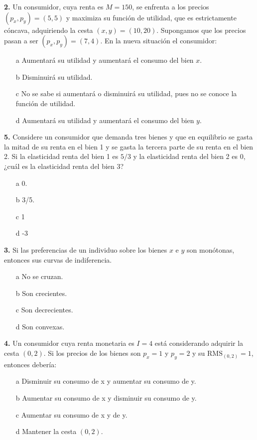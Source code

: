 \documentclass{nuevotema}
\begin{document}
\textbf{2.} Un consumidor, cuya renta es $M=150$, se enfrenta a los precios $(p_x, p_y) = (5,5)$ y maximiza su función de utilidad, que es estrictamente cóncava, adquiriendo la cesta $(x,y) = (10,20)$. Supongamos que los precios pasan a ser $(p_x, p_y) = (7,4)$. En la nueva situación el consumidor:
\begin{enumerate}
	\item[a] Aumentará su utilidad y aumentará el consumo del bien $x$.
	\item[b] Disminuirá su utilidad.
	\item[c] No se sabe si aumentará o disminuirá su utilidad, pues no se conoce la función de utilidad.
	\item[d] Aumentará su utilidad y aumentará el consumo del bien $y$.
\end{enumerate}

\textbf{5.} Considere un consumidor que demanda tres bienes y que en equilibrio se gasta la mitad de su renta en el bien 1 y se gasta la tercera parte de su renta en el bien 2. Si la elasticidad renta del bien 1 es $5/3$ y la elasticidad renta del bien 2 es 0, ¿cuál es la elasticidad renta del bien 3?

\begin{enumerate}
    \item[a] 0.
    \item[b] 3/5.
    \item[c] 1
    \item[d] -3
\end{enumerate}

\textbf{3.} Si las preferencias de un individuo sobre los bienes $x$ e $y$ son monótonas, entonces sus curvas de indiferencia.
\begin{enumerate}
    \item[a] No se cruzan.
    \item[b] Son crecientes.
    \item[c] Son decrecientes.
    \item[d] Son convexas.
\end{enumerate}

\textbf{4.} Un consumidor cuya renta monetaria es $I=4$ está considerando adquirir la cesta $(0,2)$. Si los precios de los bienes son $p_x = 1$ y $p_y = 2$ y su $\text{RMS}_{(0,2)} = 1$, entonces debería:
\begin{enumerate}
    \item[a] Disminuir su consumo de x y aumentar su consumo de y.
    \item[b] Aumentar su consumo de x y disminuir su consumo de y.
    \item[c] Aumentar su consumo de x y de y.
    \item[d] Mantener la cesta $(0,2)$.
\end{enumerate}
\end{document}
